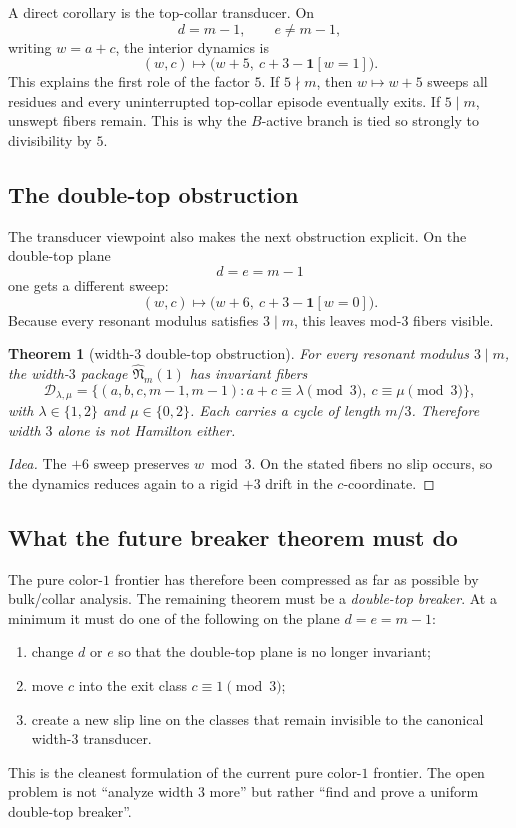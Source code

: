 \documentclass[11pt]{article}
\newtheorem{theorem}{Theorem}[section]
\newcommand{\wdthree}{\widehat{\mathfrak N}_m(1)}
\begin{document}
A direct corollary is the top-collar transducer.
On
\[
d=m-1,\qquad e\neq m-1,
\]
writing $w=a+c$, the interior dynamics is
\[
(w,c)\mapsto \bigl(w+5,\ c+3-\mathbf 1[w=1]\bigr).
\]
This explains the first role of the factor $5$.
If $5\nmid m$, then $w\mapsto w+5$ sweeps all residues and every uninterrupted
top-collar episode eventually exits.
If $5\mid m$, unswept fibers remain.
This is why the $B$-active branch is tied so strongly to divisibility by $5$.

\subsection{The double-top obstruction}

The transducer viewpoint also makes the next obstruction explicit.
On the double-top plane
\[
d=e=m-1
\]
one gets a different sweep:
\[
(w,c)\mapsto \bigl(w+6,\ c+3-\mathbf 1[w=0]\bigr).
\]
Because every resonant modulus satisfies $3\mid m$, this leaves mod-$3$ fibers
visible.

\begin{theorem}[width-3 double-top obstruction]
For every resonant modulus $3\mid m$, the width-$3$ package $\wdthree$ has
invariant fibers
\[
\mathcal D_{\lambda,\mu}
=
\{(a,b,c,m-1,m-1): a+c\equiv \lambda\!\!\pmod3,\ c\equiv \mu\!\!\pmod3\},
\]
with $\lambda\in\{1,2\}$ and $\mu\in\{0,2\}$.
Each carries a cycle of length $m/3$.
Therefore width $3$ alone is not Hamilton either.
\end{theorem}

\begin{proof}[Idea]
The $+6$ sweep preserves $w\bmod 3$.
On the stated fibers no slip occurs, so the dynamics reduces again to a rigid
$+3$ drift in the $c$-coordinate.
\end{proof}

\subsection{What the future breaker theorem must do}

The pure color-$1$ frontier has therefore been compressed as far as possible by
bulk/collar analysis.
The remaining theorem must be a \emph{double-top breaker}.
At a minimum it must do one of the following on the plane $d=e=m-1$:
\begin{enumerate}[label=\textup{(\arabic*)},leftmargin=2.8em]
\item change $d$ or $e$ so that the double-top plane is no longer invariant;
\item move $c$ into the exit class $c\equiv 1\pmod3$;
\item create a new slip line on the classes that remain invisible to the
      canonical width-$3$ transducer.
\end{enumerate}
This is the cleanest formulation of the current pure color-$1$ frontier.
The open problem is not ``analyze width $3$ more'' but rather ``find and prove a
uniform double-top breaker''.
\end{document}
